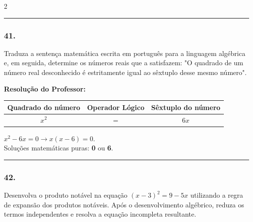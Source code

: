 \begin{multicols*}{2}
\par\vspace{\espacoQuestao}

\noindent\textcolor{CorLinha}{\rule{\linewidth}{0.5pt}} 
\par\vspace{\espacoPreQuestao}
\subsubsection*{41.} Traduza a sentença matemática escrita em português para a linguagem algébrica e, em seguida, determine os números reais que a satisfazem: "O quadrado de um número real desconhecido é estritamente igual ao sêxtuplo desse mesmo número".

\ifgabarito
    \begin{tcolorbox}[colback=CorTitUm!5, colframe=CorTitUm, boxrule=1pt, arc=4pt, left=6pt, right=6pt, top=6pt, bottom=6pt]
    \small\textbf{\textcolor{CorTitUm}{Resolução do Professor:}}\par\vspace{0.1cm}
    \color{CinzaEscuro}
    \begin{center}
    \begin{tabular}{|c|c|c|}
    \hline
    \textbf{Quadrado do número} & \textbf{Operador Lógico} & \textbf{Sêxtuplo do número} \\
    \hline
    $x^2$ & $=$ & $6x$ \\
    \hline
    \end{tabular}
    \end{center}
    \vspace{0.1cm}
    $x^2 - 6x = 0 \rightarrow x(x - 6) = 0$.\\
    Soluções matemáticas puras: \textbf{0} ou \textbf{6}.
    \end{tcolorbox}
\fi

\par\vspace{\espacoQuestao}

\noindent\textcolor{CorLinha}{\rule{\linewidth}{0.5pt}} 
\par\vspace{\espacoPreQuestao}
\subsubsection*{42.} Desenvolva o produto notável na equação $ (x - 3)^2 = 9 - 5x $ utilizando a regra de expansão dos produtos notáveis. Após o desenvolvimento algébrico, reduza os termos independentes e resolva a equação incompleta resultante.


\end{multicols*}
